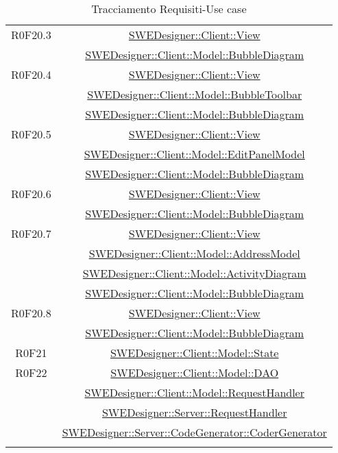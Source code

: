 \documentclass[../SpecificaTecnica.tex]{subfiles}
\begin{document}
\begin{longtable}{|c|c|}
		R0F20.3 & \hyperlink{SWEDesigner::Client::View}{SWEDesigner::Client::View} \\& \hyperlink{SWEDesigner::Client::Model::BubbleDiagram}{SWEDesigner::Client::Model::BubbleDiagram}\\\hline
		R0F20.4 & \hyperlink{SWEDesigner::Client::View}{SWEDesigner::Client::View} \\& \hyperlink{SWEDesigner::Client::Model::BubbleToolbar}{SWEDesigner::Client::Model::BubbleToolbar} \\& \hyperlink{SWEDesigner::Client::Model::BubbleDiagram}{SWEDesigner::Client::Model::BubbleDiagram} \\\hline
		R0F20.5 & \hyperlink{SWEDesigner::Client::View}{SWEDesigner::Client::View} \\& \hyperlink{SWEDesigner::Client::Model::EditPanelModel}{SWEDesigner::Client::Model::EditPanelModel} \\& \hyperlink{SWEDesigner::Client::Model::BubbleDiagram}{SWEDesigner::Client::Model::BubbleDiagram}\\\hline
		R0F20.6 & \hyperlink{SWEDesigner::Client::View}{SWEDesigner::Client::View} \\& \hyperlink{SWEDesigner::Client::Model::BubbleDiagram}{SWEDesigner::Client::Model::BubbleDiagram}\\\hline
		R0F20.7 & \hyperlink{SWEDesigner::Client::View}{SWEDesigner::Client::View} \\& \hyperlink{SWEDesigner::Client::Model::AddressModel}{SWEDesigner::Client::Model::AddressModel} \\& \hyperlink{SWEDesigner::Client::Model::ActivityDiagram}{SWEDesigner::Client::Model::ActivityDiagram} \\& \hyperlink{SWEDesigner::Client::Model::BubbleDiagram}{SWEDesigner::Client::Model::BubbleDiagram}\\\hline
		R0F20.8 & \hyperlink{SWEDesigner::Client::View}{SWEDesigner::Client::View} \\& \hyperlink{SWEDesigner::Client::Model::BubbleDiagram}{SWEDesigner::Client::Model::BubbleDiagram}\\\hline
		R0F21 & \hyperlink{SWEDesigner::Client::Model::State}{SWEDesigner::Client::Model::State}\\\hline
		R0F22 & \hyperlink{SWEDesigner::Client::Model::DAO}{SWEDesigner::Client::Model::DAO} \\& \hyperlink{SWEDesigner::Client::Model::RequestHandler}{SWEDesigner::Client::Model::RequestHandler} \\& \hyperlink{SWEDesigner::Server::RequestHandler}{SWEDesigner::Server::RequestHandler} \\& \hyperlink{SWEDesigner::Server::CodeGenerator::CoderGenerator}{SWEDesigner::Server::CodeGenerator::CoderGenerator} \\\hline
		\caption[Tracciamento Requisiti-Use case]{Tracciamento Requisiti-Use case}
		\label{tabella:requi-usecase}
	\end{longtable}
	\clearpage
\end{document}
